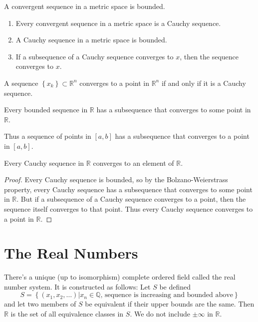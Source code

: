 \documentclass[10pt]{report}
\begin{document}
\begin{prop}
	A convergent sequence in a metric space is bounded.
\end{prop}

\pagebreak

\begin{prop}
	\begin{enumerate}
		\item Every convergent sequence in a metric space is a Cauchy sequence.
		\item A Cauchy sequence in a metric space is bounded.
		\item If a subsequence of a Cauchy sequence converges to $x$, then the sequence converges to $x$.
	\end{enumerate}
\end{prop}

\begin{thrm}{}{}
	A sequence $\left\{ x_k \right\} \subset \mathbb{R}^n$ converges to a point in $\mathbb{R}^n$ if and only if it is a Cauchy sequence.
\end{thrm}

\begin{thrm}
	Every bounded sequence in $\mathbb{R}$ has a subsequence that converges to some point in $\mathbb{R}$.
\end{thrm}

Thus a sequence of points in $[a,b]$ has a subsequence that converges to a point in $[a,b]$.

\begin{thrm}[]
	Every Cauchy sequence in $\mathbb{R}$ converges to an element of $\mathbb{R}$.
\end{thrm}
\begin{proof}
Every Cauchy sequence is bounded, so by the Bolzano-Weierstrass property, every Cauchy sequence has a subsequence that converges to some point in $\mathbb{R}$. But if a subsequence of a Cauchy sequence converges to a point, then the sequence itself converges to that point. Thus every Cauchy sequence converges to a point in $\mathbb{R}$.
\end{proof}


\section{The Real Numbers}

\begin{thrm}[]
	There's a unique (up to isomorphism) complete ordered field called the real number system. It is constructed as follows:
	Let $S$ be defined
	\[
		S = \left\{ (x_1, x_2, \dots) | x_n \in \mathbb{Q} \text{, sequence is increasing and bounded above} \right\}
	\] 
	and let two members of $S$ be equivalent if their upper bounds are the same. Then $\mathbb{R}$ is the set of all equivalence classes in $S$. We do not include $\pm \infty$ in $\mathbb{R}$.
\end{thrm}
\end{document}
